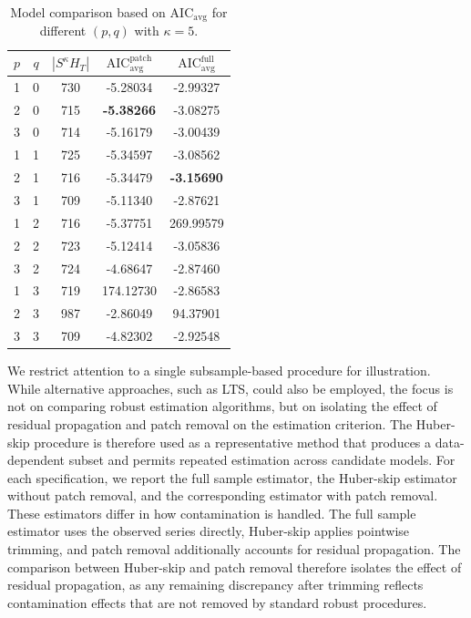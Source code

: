 \documentclass[12pt]{article}
\numberwithin{equation}{section}
\begin{document}
\begin{table}[ht]
\centering
\begin{tabular}{ccccc}
\toprule
$p$ & $q$ & $|S^\kappa H_T|$ & $\mathrm{AIC}_{\mathrm{avg}}^{\text{patch}}$ & $\mathrm{AIC}_{\mathrm{avg}}^{\text{full}}$ \\
\midrule
1 & 0 & 730 & -5.28034 & -2.99327 \\
2 & 0 & 715 & \textbf{-5.38266} & -3.08275 \\
3 & 0 & 714 & -5.16179 & -3.00439 \\
1 & 1 & 725 & -5.34597 & -3.08562 \\
2 & 1 & 716 & -5.34479 & \textbf{-3.15690} \\
3 & 1 & 709 & -5.11340 & -2.87621 \\
1 & 2 & 716 & -5.37751 & 269.99579 \\
2 & 2 & 723 & -5.12414 & -3.05836 \\
3 & 2 & 724 & -4.68647 & -2.87460 \\
1 & 3 & 719 & 174.12730 & -2.86583 \\
2 & 3 & 987 & -2.86049 & 94.37901 \\
3 & 3 & 709 & -4.82302 & -2.92548 \\
\bottomrule
\end{tabular}
\caption{Model comparison based on $\mathrm{AIC}_{\mathrm{avg}}$ for different $(p,q)$ with $\kappa=5$.}
\label{tab:aic_avg}
\end{table}

We restrict attention to a single subsample-based procedure for illustration. While alternative approaches, such as LTS, could also be employed, the focus is not on comparing robust estimation algorithms, but on isolating the effect of residual propagation and patch removal on the estimation criterion. The Huber-skip procedure is therefore used as a representative method that produces a data-dependent subset and permits repeated estimation across candidate models.
For each specification, we report the full sample estimator, the Huber-skip estimator without patch removal, and the corresponding estimator with patch removal.
These estimators differ in how contamination is handled.
The full sample estimator uses the observed series directly, Huber-skip applies pointwise trimming, and patch removal additionally accounts for residual propagation.
The comparison between Huber-skip and patch removal therefore isolates the effect of residual propagation, as any remaining discrepancy after trimming reflects contamination effects that are not removed by standard robust procedures.
\end{document}
